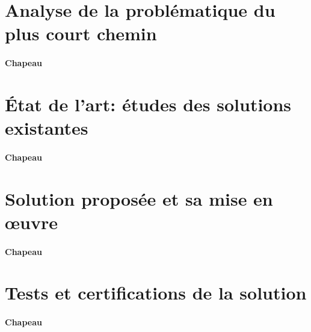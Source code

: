\section{Analyse de la problématique du plus court chemin} \label{sec:ProblematiquePlusCourtChemin}

\paragraph{Chapeau}


\section{État de l’art: études des solutions existantes} \label{sec:etatDeLart3}

\paragraph{Chapeau}


\section{Solution proposée et sa mise en œuvre} \label{sec:solution3}

\paragraph{Chapeau}


\section{Tests et certifications de la solution} \label{sec:test3}

\paragraph{Chapeau}
